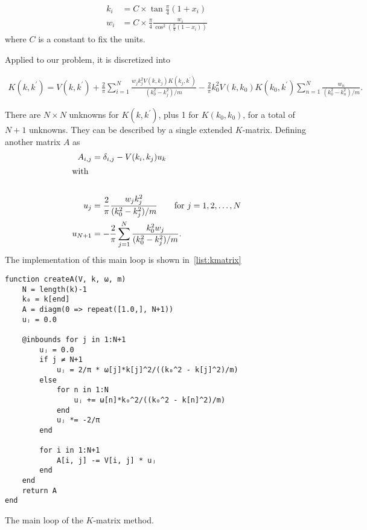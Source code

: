 \begin{align*}
  k_{i} &= C\times \tan{\frac{\pi}{4}(1+x_{i})}\\
  w_{i} &= C\times \frac{\pi}{4}\frac{w_{i}}{\cos^{2}\left( \frac{\pi}{4}(1-x_{i}) \right)}
\end{align*}
where \(C\) is a constant to fix the units.

Applied to our problem, it is discretized into

\begin{align*}
  K(k, k^{\prime}) = V(k, k^{\prime}) + \frac{2}{\pi}\sum_{i=1}^{N}
  \frac{w_{j}k_{j}^{2}V(k, k_{j})K(k_{j},k^{\prime})}{(k_{0}^{2}-k_{j}^{2})/m}
  - \frac{2}{\pi}k_{0}^{2}V(k, k_{0})K(k_{0},k^{\prime})\sum_{n=1}^{N}
  \frac{w_{n}}{(k_{0}^{2}-k_{n}^{2})/m}.
\end{align*}

There are \(N\times N\) unknowns for \(K(k, k^{\prime})\), plus 1 for \(K(k_{0},
k_{0})\), for a total of \(N+1\) unknowns. They can be described by a single
extended \(K\)-matrix. Defining another matrix \(A\) as
\begin{align*}
  A_{i,j} &= \delta_{i,j} - V(k_{i}, k_{j})u_{k}\\
  \intertext{with}\\
            u_{j} &= \frac{2}{\pi} \frac{w_{j}k_{j}^{2}}{(k_{0}^{2}-k_{j}^{2})/m}
                    \qquad \text{for } j = 1, 2, \ldots, N \\
  u_{N+1} &= - \frac{2}{\pi}\sum_{j=1}^{N}\frac{k_{0}^{2}w_{j}}{(k_{0}^{2}-k_{j}^{2})/m}.
\end{align*}
The implementation of this main loop is shown in~\cref{list:kmatrix}

\begin{listing}
\begin{verbatim}
function createA(V, k, ω, m)
    N = length(k)-1
    k₀ = k[end]
    A = diagm(0 => repeat([1.0,], N+1))
    uⱼ = 0.0

    @inbounds for j in 1:N+1
        uⱼ = 0.0
        if j ≠ N+1
            uⱼ = 2/π * ω[j]*k[j]^2/((k₀^2 - k[j]^2)/m)
        else
            for n in 1:N
                uⱼ += ω[n]*k₀^2/((k₀^2 - k[n]^2)/m)
            end
            uⱼ *= -2/π
        end

        for i in 1:N+1
            A[i, j] -= V[i, j] * uⱼ
        end
    end
    return A
end
\end{verbatim}
\label{list:kmatrix}
\caption{The main loop of the \(K\)-matrix method.}
\end{listing}

